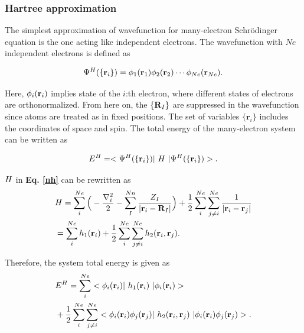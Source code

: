 \documentclass[a4paper, 12pt, titlepage,oneside,drop]{kthesis}
\begin{document}
\subsubsection{Hartree approximation}
\label{ha}
The simplest approximation of wavefunction for many-electron Schrödinger equation is the one acting like independent
electrons. The wavefunction with $Ne$ independent electrons is defined as

\begin{equation}\label{wfh}
\wfh = \bwff<1><1> \bwff<2><2> \cdots \bwff<Ne><Ne>. 
\end{equation}

Here, $\bwff<i><i>$ implies state of the $i$:th electron, where different states of electrons are orthonormalized. From here on, the $\{{\textbf R}_I\}$ are suppressed in the
wavefunction since atoms are treated as in fixed positions. The set of variables ${\{\textbf{r}_{{i}}}\}$ includes the coordinates of space and spin. The total energy of the many-electron system can be written as

\begin{equation}\label{teh}
E^{{H}} = <\Psi^{{H}}(\{ {\textbf r}_{{i}}\}) |\ {{H}} \ | \Psi^{{H}}(\{ {\textbf r}_{{i}}\})  >.
\end{equation}

${{H}}$ in \textbf{Eq. \ref{nh}} can be rewritten as
\begin{equation}\begin{split}
&  {{H}} = \sum\limits_i^{{Ne}} \Big( -\frac{{{\nabla}_{{i}}^{2}}}{2} - \sum\limits_I^{{Nn}} \frac{Z_{I}}{|\textbf{r}_{i}-\textbf{R}_{I}|} \Big) +   \frac{1}{2} \sum\limits_i^{{Ne}} \sum\limits_{j \neq i}^{{Ne}} \frac{1}{ |\textbf{r}_{i}-\textbf{r}_{j}|} \\
& = \sum\limits_i^{{Ne}} h_1(\textbf{r}_{i}) + \frac{1}{2} \sum\limits_i^{{Ne}} \sum\limits_{j \neq i}^{{Ne}} h_2(\textbf{r}_{i},\textbf{r}_{j}).
\end{split}
\end{equation}

Therefore, the system total energy is given as
\begin{equation}\begin{split}\label{bzd}
& E^{H} = \sum\limits_i^{{Ne}} <\bwff<i><i> | \  h_1(\textbf{r}_{i}) \ | \bwff<i><i> > \\
& +\frac{1}{2} \sum\limits_i^{{Ne}} \sum\limits_{j \neq i}^{{Ne}} <\bwff<i><i> \bwff<j><j>|\ h_2(\textbf{r}_{i},\textbf{r}_{j}) \ | \bwff<i><i> \bwff<j><j>>.  
\end{split}\end{equation}
\end{document}
